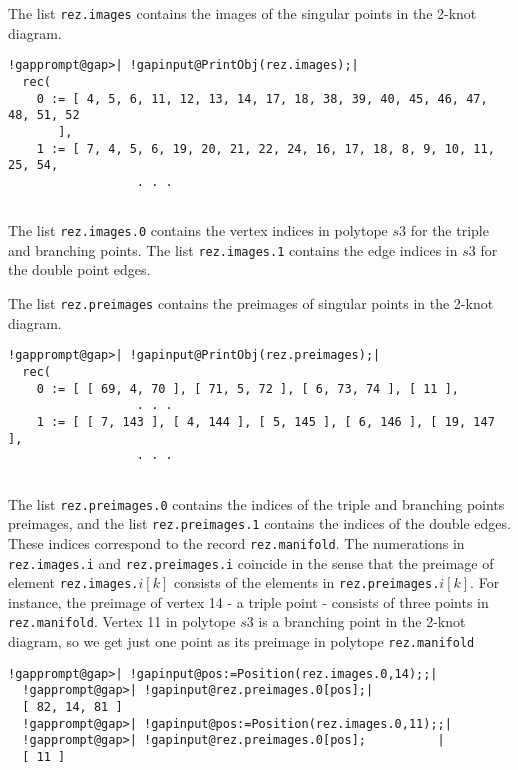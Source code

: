 \documentclass[a4paper,11pt]{report}
\begin{document}
{{{\begin{Verbatim}[commandchars=!@|,fontsize=\small,frame=single,label=Example]
\end{Verbatim}
 

 The list \texttt{rez.images} contains the images of the singular points in the 2-knot diagram. 
\begin{Verbatim}[commandchars=!@|,fontsize=\small,frame=single,label=Example]
  !gapprompt@gap>| !gapinput@PrintObj(rez.images);|
  rec(
    0 := [ 4, 5, 6, 11, 12, 13, 14, 17, 18, 38, 39, 40, 45, 46, 47, 48, 51, 52 
       ],
    1 := [ 7, 4, 5, 6, 19, 20, 21, 22, 24, 16, 17, 18, 8, 9, 10, 11, 25, 54, 
                  . . .
  					
\end{Verbatim}
 The list \texttt{rez.images.0} contains the vertex indices in polytope $s3$ for the triple and branching points. The list \texttt{rez.images.1} contains the edge indices in $s3$ for the double point edges. 

 The list \texttt{rez.preimages} contains the preimages of singular points in the 2-knot diagram. 
\begin{Verbatim}[commandchars=!@|,fontsize=\small,frame=single,label=Example]
  !gapprompt@gap>| !gapinput@PrintObj(rez.preimages);|
  rec(
    0 := [ [ 69, 4, 70 ], [ 71, 5, 72 ], [ 6, 73, 74 ], [ 11 ], 
                  . . .
    1 := [ [ 7, 143 ], [ 4, 144 ], [ 5, 145 ], [ 6, 146 ], [ 19, 147 ], 
                  . . .
  					
\end{Verbatim}
 The list \texttt{rez.preimages.0} contains the indices of the triple and branching points preimages, and the
list \texttt{rez.preimages.1} contains the indices of the double edges. These indices correspond to the
record \texttt{rez.manifold}. The numerations in \texttt{rez.images.i} and \texttt{rez.preimages.i} coincide in the sense that the preimage of element \texttt{rez.images.}$i[k]$ consists of the elements in \texttt{rez.preimages.}$i[k]$. For instance, the preimage of vertex 14 - a triple point - consists of three
points in \texttt{rez.manifold}. Vertex 11 in polytope $s3$ is a branching point in the 2-knot diagram, so we get just one point as its
preimage in polytope \texttt{rez.manifold} 
\begin{Verbatim}[commandchars=!@|,fontsize=\small,frame=single,label=Example]
  !gapprompt@gap>| !gapinput@pos:=Position(rez.images.0,14);;|
  !gapprompt@gap>| !gapinput@rez.preimages.0[pos];|
  [ 82, 14, 81 ]
  !gapprompt@gap>| !gapinput@pos:=Position(rez.images.0,11);;|
  !gapprompt@gap>| !gapinput@rez.preimages.0[pos];          |
  [ 11 ]
  					

\end{Verbatim}}}}
\end{document}
